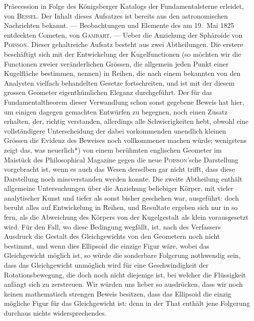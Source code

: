 \documentclass[12pt,a4paper]{article}
\begin{document}
Pr\"aecession in Folge des K\"onigsberger Katalogs der Fundamentalsterne erleidet, von \textsc{Bessel}. Der Inhalt dieses Aufsatzes ist bereits aus den astronomischen Nachrichten bekannt. --- Beobachtungen und Elemente des am 19.\ Mai 1825 entdeckten Cometen, von \textsc{Gambart}. --- Ueber die Anziehung der Sph\"aroide von \textsc{Poisson}. Dieser gehaltreiche Aufsatz besteht aus zwei Abtheilungen. Die erstere besch\"aftigt sich mit der Entwickelung der Kugelfunctionen (so m\"ochten wir die Functionen zweier ver\"anderlichen Gr\"ossen, die allgemein jeden Punkt einer Kugelfl\"ache bestimmen, nennen) in Reihen, die nach einem bekannten von den Analysten vielfach behandelten Gesetze fortschreiten, und ist mit der diesem grossen Geometer eigenth\"umlichen Eleganz durchgef\"uhrt. Der f\"ur das Fundamentaltheorem dieser Verwandlung schon sonst gegebene Beweis hat hier, um einigen dagegen gemachten Entw\"urfen zu begegnen, noch einen Zusatz erhalten, der, richtig verstanden, allerdings alle Schwierigkeiten hebt, obwohl eine vollst\"andigere Unterscheidung der dabei vorkommenden unendlich kleinen Gr\"ossen die Evidenz des Beweises noch vollkommener machen w\"urde; wenigstens zeigt das, was neuerlich*) von einem ber\"uhmten englischen Geometer im Maist\"uck des Philosophical Magazine gegen die neue \textsc{Poisson}'sche Darstellung vorgebracht ist, wenn es auch das Wesen derselben gar nicht trifft, dass diese Darstellung noch missverstanden werden konnte. Die zweite Abtheilung enth\"alt allgemeine Untersuchungen \"uber die Anziehung beliebiger K\"orper, mit vieler analytischer Kunst und tiefer als sonst bisher geschehen war, ausgef\"uhrt: doch beruht alles auf Entwickelung in Reihen, und Resultate ergeben sich nur in so fern, als die Abweichung des K\"orpers von der Kugelgestalt als klein vorausgesetzt wird. F\"ur den Fall, wo diese Bedingung wegf\"allt, ist, nach des Verfassers Ausdruck \glqq die Gestalt des Gleichgewichts von den Geometern noch nicht bestimmt, und wenn dies Ellipsoid die einzige Figur w\"are, wobei das Gleichgewicht m\"oglich ist, so w\"urde die sonderbare Folgerung nothwendig sein, dass das Gleichgewicht unm\"oglich wird f\"ur eine Geschwindigkeit der Rotationsbewegung, die doch noch nicht diejenige ist, bei welcher die Fl\"ussigkeit anf\"angt sich zu zerstreuen.\grqq{} Wir w\"urden uns lieber so ausdr\"ucken, dass wir noch keinen mathematisch strengen Beweis besitzen, dass das Ellipsoid die einzig m\"ogliche Figur f\"ur das Gleichgewicht ist: denn in der That enth\"alt jene Folgerung durchaus nichts widersprechendes.
\end{document}
